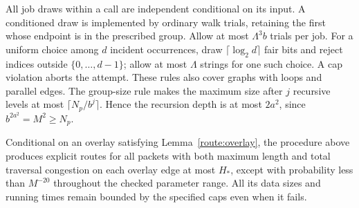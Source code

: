 All job draws within a call are independent conditional on its input.
A conditioned draw is implemented by ordinary walk trials, retaining
the first whose endpoint is in the prescribed group.  Allow at most
$\Lambda^3b$ trials per job.  For a uniform choice among $d$ incident
occurrences, draw $\lceil\log_2 d\rceil$ fair bits and reject indices
outside $\{0,\ldots,d-1\}$; allow at most $\Lambda$ strings for
one such choice.  A cap violation aborts the attempt.  These rules
also cover graphs with loops and parallel edges.  The group-size rule
makes the maximum size after $j$ recursive levels at most
$\lceil N_p/b^j\rceil$.  Hence the recursion depth is at most
$2a^2$, since $b^{2a^2}=M^2\ge N_p$.

\begin{lemma}\label{route:router}
Conditional on an overlay satisfying Lemma~\ref{route:overlay}, the
procedure above produces explicit routes for all packets with both
maximum length and total traversal congestion on each overlay edge
at most $H_*$, except with probability less than $M^{-20}$ throughout
the checked parameter range.  All its data sizes and running
times remain bounded by the specified caps even when it fails.
\end{lemma}

